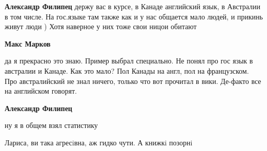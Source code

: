 \begin{itemize}
\begin{itemize}
 
\textbf{Александр Филипец} держу вас в курсе, в Канаде английский язык, в Австралии в том числе.
На гос.языке там также как и у нас общается мало людей, и прикинь живут люди )
Хотя наверное у них тоже свои ницои обитают


\begin{itemize}
 
\textbf{Макс Марков} 

да я прекрасно это знаю. Пример выбрал специально. Не понял про гос язык в
австралии и Канаде. Как это мало? Пол Канады на англ, пол на французском. Про
австралийский не знал ничего, только что вот прочитал в вики. Де-факто все на
английском говорят.


 
\textbf{Александр Филипец} 

ну я в общем взял статистику

\end{itemize}

\end{itemize}

 
Лариса, ви така агресiвна, аж гидко чути. А книжкi позорнi

 

\end{itemize}
